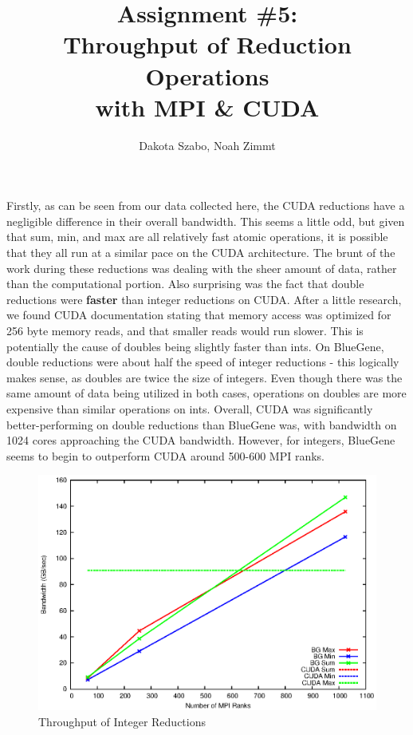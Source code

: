 \documentclass[12pt]{article}
\begin{document}
\author{Dakota Szabo, Noah Zimmt}
\title{ Assignment \#5: \\
	\textbf{
		Throughput of Reduction Operations \\
		with MPI \& CUDA
	}
}
\maketitle

\doublespacing

Firstly, as can be seen from our data collected here, the CUDA reductions have a negligible difference in their overall bandwidth. This seems a little odd, but given that sum, min, and max are all relatively fast atomic operations, it is possible that they all run at a similar pace on the CUDA architecture. The brunt of the work during these reductions was dealing with the sheer amount of data, rather than the computational portion. Also surprising was the fact that double reductions were {\bf faster} than integer reductions on CUDA. After a little research, we found CUDA documentation stating that memory access was optimized for 256 byte memory reads, and that smaller reads would run slower. This is potentially the cause of doubles being slightly faster than ints. On BlueGene, double reductions were about half the speed of integer reductions - this logically makes sense, as doubles are twice the size of integers. Even though there was the same amount of data being utilized in both cases, operations on doubles are more expensive than similar operations on ints. Overall, CUDA was significantly better-performing on double reductions than BlueGene was, with bandwidth on 1024 cores approaching the CUDA bandwidth. However, for integers, BlueGene seems to begin to outperform CUDA around 500-600 MPI ranks. 

\begin{figure}
	\includegraphics[width=\textwidth]{mpi/int.eps}
	\caption{Throughput of Integer Reductions}
\end{figure}
\end{document}
